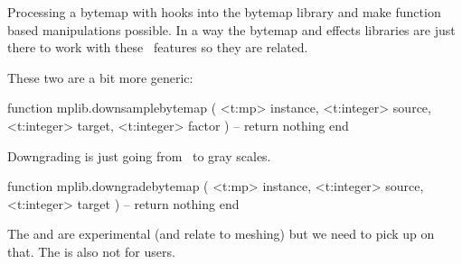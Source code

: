 Processing a bytemap with  hooks into the bytemap library
and make function based manipulations possible. In a way the bytemap and effects
libraries are just there to work with these \LUAMETAFUN\ features so they are
related.

These two are a bit more generic:

\starttyping[option=LUA]
function mplib.downsamplebytemap (
    <t:mp>      instance,
    <t:integer> source,
    <t:integer> target,
    <t:integer> factor
)
    -- return nothing
end
\stoptyping

Downgrading is just going from \RGB\ to gray scales.

\starttyping[option=LUA]
function mplib.downgradebytemap (
    <t:mp>      instance,
    <t:integer> source,
    <t:integer> target
)
    -- return nothing
end
\stoptyping

\stopsection

\startsection[title=Experimental]

The  and  are experimental (and relate
to meshing) but we need to pick up on that. The  is also
not for users.

\stopsection

\stopdocument
